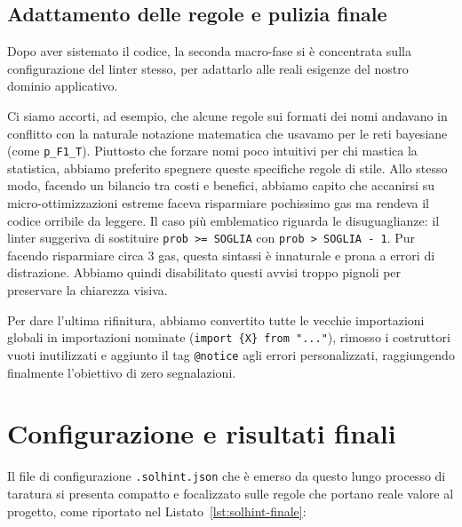 \subsection{Adattamento delle regole e pulizia finale}

Dopo aver sistemato il codice, la seconda macro-fase si è concentrata sulla configurazione del linter stesso, per adattarlo alle reali esigenze del nostro dominio applicativo. 

Ci siamo accorti, ad esempio, che alcune regole sui formati dei nomi andavano in conflitto con la naturale notazione matematica che usavamo per le reti bayesiane (come \texttt{p\_F1\_T}). Piuttosto che forzare nomi poco intuitivi per chi mastica la statistica, abbiamo preferito spegnere queste specifiche regole di stile.
Allo stesso modo, facendo un bilancio tra costi e benefici, abbiamo capito che accanirsi su micro-ottimizzazioni estreme faceva risparmiare pochissimo gas ma rendeva il codice orribile da leggere. Il caso più emblematico riguarda le disuguaglianze: il linter suggeriva di sostituire \texttt{prob >= SOGLIA} con \texttt{prob > SOGLIA - 1}. Pur facendo risparmiare circa 3 gas, questa sintassi è innaturale e prona a errori di distrazione. Abbiamo quindi disabilitato questi avvisi troppo pignoli per preservare la chiarezza visiva.

Per dare l'ultima rifinitura, abbiamo convertito tutte le vecchie importazioni globali in importazioni nominate (\texttt{import \{X\} from "..."}), rimosso i costruttori vuoti inutilizzati e aggiunto il tag \texttt{@notice} agli errori personalizzati, raggiungendo finalmente l'obiettivo di zero segnalazioni.

\section{Configurazione e risultati finali}\label{sec:config-risultati-finali}

Il file di configurazione \texttt{.solhint.json} che è emerso da questo lungo processo di taratura si presenta compatto e focalizzato sulle regole che portano reale valore al progetto, come riportato nel Listato~\ref{lst:solhint-finale}:

